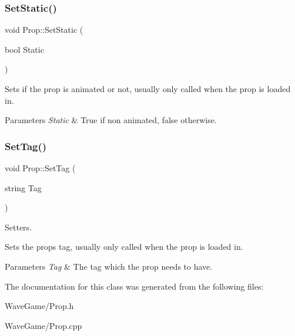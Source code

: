 \subsubsection{\texorpdfstring{Set\+Static()}{SetStatic()}}
{\footnotesize\ttfamily void Prop\+::\+Set\+Static (\begin{DoxyParamCaption}\item[{bool}]{Static }\end{DoxyParamCaption})}



Sets if the prop is animated or not, usually only called when the prop is loaded in. 


\begin{DoxyParams}{Parameters}
{\em Static} & True if non animated, false otherwise.\\
\hline
\end{DoxyParams}
\mbox{\label{class_prop_aa082e05be14b0d17d28e58edc5311099}} 
\subsubsection{\texorpdfstring{Set\+Tag()}{SetTag()}}
{\footnotesize\ttfamily void Prop\+::\+Set\+Tag (\begin{DoxyParamCaption}\item[{string}]{Tag }\end{DoxyParamCaption})}



Setters. 

Sets the props tag, usually only called when the prop is loaded in.


\begin{DoxyParams}{Parameters}
{\em Tag} & The tag which the prop needs to have.\\
\hline
\end{DoxyParams}


The documentation for this class was generated from the following files\+:\begin{DoxyCompactItemize}
\item 
Wave\+Game/Prop.\+h\item 
Wave\+Game/Prop.\+cpp\end{DoxyCompactItemize}
